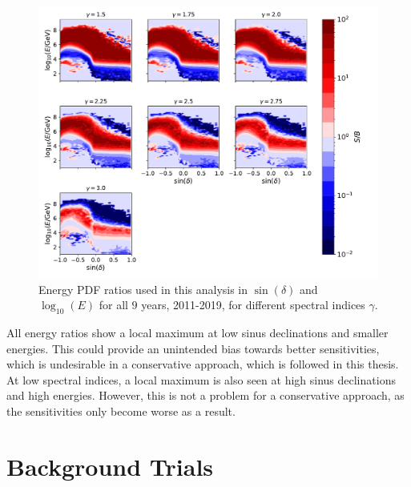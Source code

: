 \begin{figure}
    \centering
    \includegraphics[width=\linewidth]{Plots/05_csky/energy_pdf_ratio.pdf}
    \caption{Energy PDF ratios used in this analysis in $\sin{(\delta)}$ and $\log_{10}{(E)}$ for all $\num{9}$ years, 2011-2019, for different spectral indices $\gamma$.}
    \label{fig:energy_ratio_time_int}
\end{figure}

All energy ratios show a local maximum at low sinus declinations and smaller energies.
This could provide an unintended bias towards better sensitivities, which is undesirable in a conservative approach, which is followed in this thesis.
At low spectral indices, a local maximum is also seen at high sinus declinations and high energies.
However, this is not a problem for a conservative approach, as the sensitivities only become worse as a result.

\section{Background Trials}

